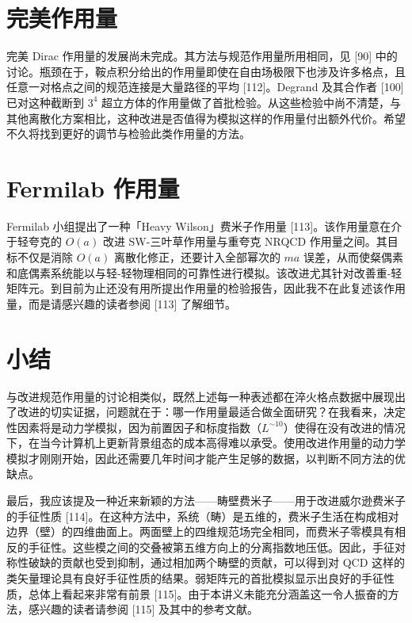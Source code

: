\section{完美作用量}

完美 Dirac 作用量的发展尚未完成。其方法与规范作用量所用相同，见 [90] 中的讨论。瓶颈在于，鞍点积分给出的作用量即使在自由场极限下也涉及许多格点，且任意一对格点之间的规范连接是大量路径的平均 [112]。Degrand 及其合作者 [100] 已对这种截断到 $3^4$ 超立方体的作用量做了首批检验。从这些检验中尚不清楚，与其他离散化方案相比，这种改进是否值得为模拟这样的作用量付出额外代价。希望不久将找到更好的调节与检验此类作用量的方法。

\section{Fermilab 作用量}

Fermilab 小组提出了一种「Heavy Wilson」费米子作用量 [113]。该作用量意在介于轻夸克的 $O(a)$ 改进 SW-三叶草作用量与重夸克 NRQCD 作用量之间。其目标不仅是消除 $O(a)$ 离散化修正，还要计入全部幂次的 $ma$ 误差，从而使粲偶素和底偶素系统能以与轻-轻物理相同的可靠性进行模拟。该改进尤其针对改善重-轻矩阵元。到目前为止还没有用所提出作用量的检验报告，因此我不在此复述该作用量，而是请感兴趣的读者参阅 [113] 了解细节。

\section{小结}

与改进规范作用量的讨论相类似，既然上述每一种表述都在淬火格点数据中展现出了改进的切实证据，问题就在于：哪一作用量最适合做全面研究？在我看来，决定性因素将是动力学模拟，因为前置因子和标度指数（$L^{\sim 10}$）使得在没有改进的情况下，在当今计算机上更新背景组态的成本高得难以承受。使用改进作用量的动力学模拟才刚刚开始，因此还需要几年时间才能产生足够的数据，以判断不同方法的优缺点。

最后，我应该提及一种近来新颖的方法——畴壁费米子——用于改进威尔逊费米子的手征性质 [114]。在这种方法中，系统（畴）是五维的，费米子生活在构成相对边界（壁）的四维曲面上。两面壁上的四维规范场完全相同，而费米子零模具有相反的手征性。这些模之间的交叠被第五维方向上的分离指数地压低。因此，手征对称性破缺的贡献也受到抑制，通过相加两个畴壁的贡献，可以得到对 QCD 这样的类矢量理论具有良好手征性质的结果。弱矩阵元的首批模拟显示出良好的手征性质，总体上看起来非常有前景 [115]。由于本讲义未能充分涵盖这一令人振奋的方法，感兴趣的读者请参阅 [115] 及其中的参考文献。
